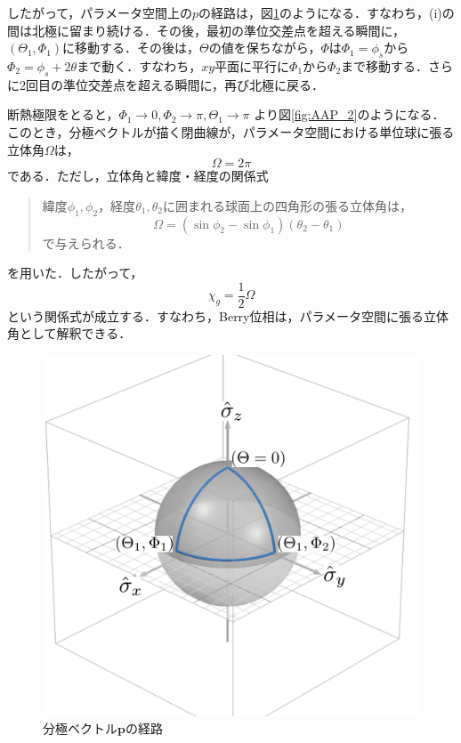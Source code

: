 したがって，パラメータ空間上の$p$の経路は，図\ref{fig:AAP_1}のようになる．すなわち，(i)の間は北極に留まり続ける．その後，最初の準位交差点を超える瞬間に，$(\Theta_1, \Phi_1)$に移動する．その後は，$\Theta$の値を保ちながら，$\Phi$は$\Phi_1 = \phi_s$から$\Phi_2 = \phi_s + 2\theta$まで動く．すなわち，$xy$平面に平行に$\Phi_1$から$\Phi_2$まで移動する．さらに2回目の準位交差点を超える瞬間に，再び北極に戻る．


断熱極限をとると，$\Phi_1 \rightarrow 0, \Phi_2 \rightarrow\pi, \Theta_1 \rightarrow \pi$
より図\ref{fig:AAP_2}のようになる．このとき，分極ベクトルが描く閉曲線が，パラメータ空間における単位球に張る立体角$\Omega$は，
\begin{equation}
  \Omega = 2\pi
\end{equation}
である．ただし，立体角と緯度・経度の関係式
\begin{quote}
  緯度$\phi_1, \phi_2$，経度$\theta_1, \theta_2$に囲まれる球面上の四角形の張る立体角は，
  \begin{equation}
    \Omega = (\sin \phi_2 - \sin \phi_1) (\theta_2 - \theta_1)
  \end{equation}
  で与えられる．
\end{quote}
を用いた．したがって，
\begin{equation}
  \chi_g = \frac{1}{2} \Omega \label{solidangle_g}
\end{equation}
という関係式が成立する．すなわち，Berry位相は，パラメータ空間に張る立体角として解釈できる．

\begin{figure}[htbp]
  \centering
  \includegraphics[scale=0.5]{figures/AAP_1.png}
  \caption{分極ベクトル$\bm{p}$の経路}
  \label{fig:AAP_1}
\end{figure}

